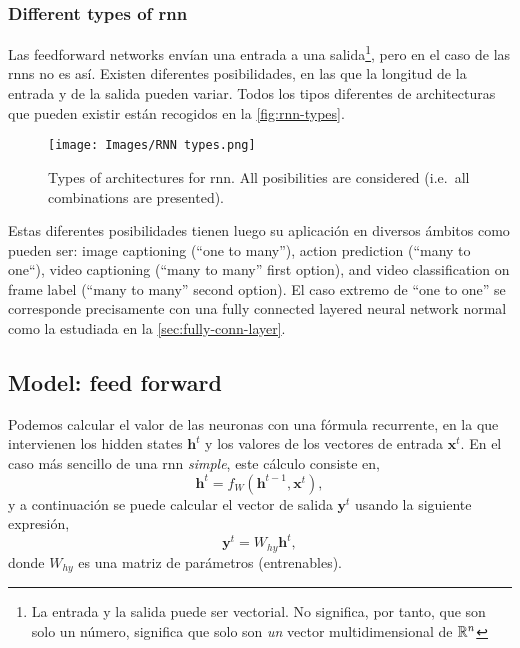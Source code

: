 \subsubsection{Different types of \gls*{rnn}}
Las feedforward networks envían una entrada a una salida\footnote{La entrada y
  la salida puede ser vectorial. No significa, por tanto, que son solo un
  número, significa que solo son \emph{un} vector multidimensional de
  \(\mathbb{R}^n\)}, pero en el caso de las \glspl{rnn} no es así. Existen diferentes
posibilidades, en las que la longitud de la entrada y de la salida pueden
variar. Todos los tipos diferentes de architecturas que pueden existir están
recogidos en la \vref{fig:rnn-types}.

\begin{figure}[ht]
  \centering
  \texttt{[image: Images/RNN types.png]}
  \caption[Types of architectures for \gls{rnn}]{Types of architectures for
    \gls{rnn}. All posibilities are considered (i.e.\ all combinations are
    presented).}
  \label{fig:rnn-types}
\end{figure}

Estas diferentes posibilidades tienen luego su aplicación en diversos ámbitos
como pueden ser: image captioning (``one to many''), action prediction (``many
to one``), video captioning (``many to many'' first option), and video
classification on frame label (``many to many'' second option). El caso extremo
de ``one to one'' se corresponde precisamente con una fully connected layered
neural network normal como la estudiada en la \vref{sec:fully-conn-layer}.

\subsection{Model: feed forward}

Podemos calcular el valor de las neuronas con una fórmula recurrente, en la que
intervienen los hidden states \(\mathbf{h}^t\) y los valores de los vectores de
entrada \(\mathbf{x}^t\). En el caso más sencillo de una \gls{rnn}
\emph{simple}, este cálculo consiste en,
\begin{equation} \label{eq:rnn-hidden}
  \mathbf{h}^t = f_{W} (\mathbf{h}^{t - 1}, \mathbf{x}^t),
\end{equation}
y a continuación se puede calcular el vector de salida \(\mathbf{y}^t\) usando
la siguiente expresión,
\begin{equation} \label{eq:rnn-out}
  \mathbf{y}^t = W_{hy}\mathbf{h}^t,
\end{equation}
donde \(W_{hy}\) es una matriz de parámetros (entrenables).

